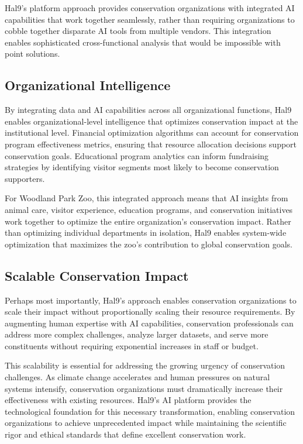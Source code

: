 \documentclass[
  Letterpaper,
]{scrbook}
\begin{document}
Hal9's platform approach provides conservation organizations with
integrated AI capabilities that work together seamlessly, rather than
requiring organizations to cobble together disparate AI tools from
multiple vendors. This integration enables sophisticated
cross-functional analysis that would be impossible with point solutions.

\subsection{Organizational
Intelligence}\label{organizational-intelligence}

By integrating data and AI capabilities across all organizational
functions, Hal9 enables organizational-level intelligence that optimizes
conservation impact at the institutional level. Financial optimization
algorithms can account for conservation program effectiveness metrics,
ensuring that resource allocation decisions support conservation goals.
Educational program analytics can inform fundraising strategies by
identifying visitor segments most likely to become conservation
supporters.

For Woodland Park Zoo, this integrated approach means that AI insights
from animal care, visitor experience, education programs, and
conservation initiatives work together to optimize the entire
organization's conservation impact. Rather than optimizing individual
departments in isolation, Hal9 enables system-wide optimization that
maximizes the zoo's contribution to global conservation goals.

\subsection{Scalable Conservation
Impact}\label{scalable-conservation-impact}

Perhaps most importantly, Hal9's approach enables conservation
organizations to scale their impact without proportionally scaling their
resource requirements. By augmenting human expertise with AI
capabilities, conservation professionals can address more complex
challenges, analyze larger datasets, and serve more constituents without
requiring exponential increases in staff or budget.

This scalability is essential for addressing the growing urgency of
conservation challenges. As climate change accelerates and human
pressures on natural systems intensify, conservation organizations must
dramatically increase their effectiveness with existing resources.
Hal9's AI platform provides the technological foundation for this
necessary transformation, enabling conservation organizations to achieve
unprecedented impact while maintaining the scientific rigor and ethical
standards that define excellent conservation work.
\end{document}
